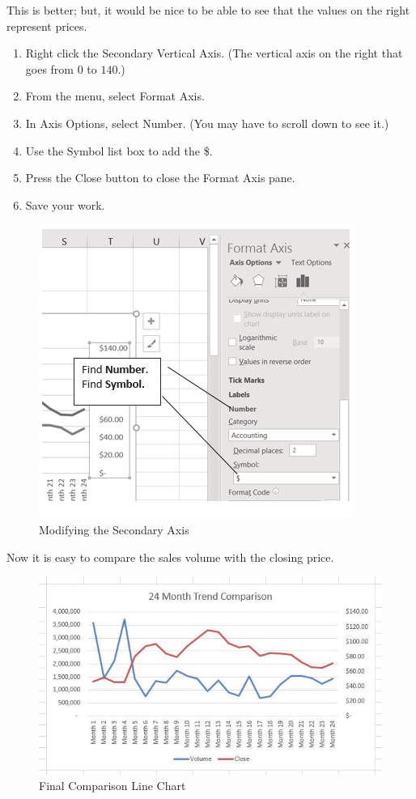 This is better; but, it would be nice to be able to see that the values on the right represent prices.

\begin{enumerate}
	\item Right click the Secondary Vertical Axis. (The vertical axis on the right that goes from $ 0 $ to $ 140 $.)
	\item From the menu, select Format Axis.
	\item In Axis Options, select Number. (You may have to scroll down to see it.)
	\item Use the Symbol list box to add the \$.
	\item Press the Close button to close the Format Axis pane.
	\item Save your work.
\end{enumerate}

\begin{figure}[H]
	\centering
	\includegraphics[width=\maxwidth{.95\linewidth}]{gfx/ch04_fig09}
	\caption{Modifying the Secondary Axis}
	\label{04:fig09}
\end{figure}

Now it is easy to compare the sales volume with the closing price.

\begin{figure}[H]
	\centering
	\includegraphics[width=\maxwidth{.95\linewidth}]{gfx/ch04_fig10}
	\caption{Final Comparison Line Chart}
	\label{04:fig10}
\end{figure}

